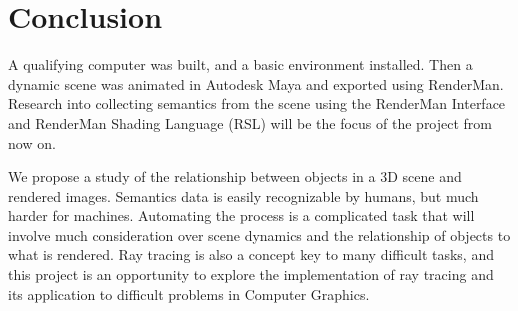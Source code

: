 \documentclass[conference]{IEEEtran}
\begin{document}
\section{Conclusion}
\label{sec:conclusion}
A qualifying computer was built, and a basic environment installed.
Then a dynamic scene was animated in Autodesk Maya and exported
using RenderMan. Research into collecting semantics from the scene using
the RenderMan Interface and RenderMan Shading Language (RSL)
will be the focus of the project from now on.

We propose a study of the relationship between objects in a 3D scene and rendered images.
Semantics data is easily recognizable by humans, but much harder for machines.
Automating the process is a complicated task that will involve much consideration over
scene dynamics and the relationship of objects to what is rendered.
Ray tracing is also a concept
key to many difficult tasks, and this project is an
opportunity to explore the implementation of ray tracing and its application
to difficult problems in Computer Graphics.



\end{document}

